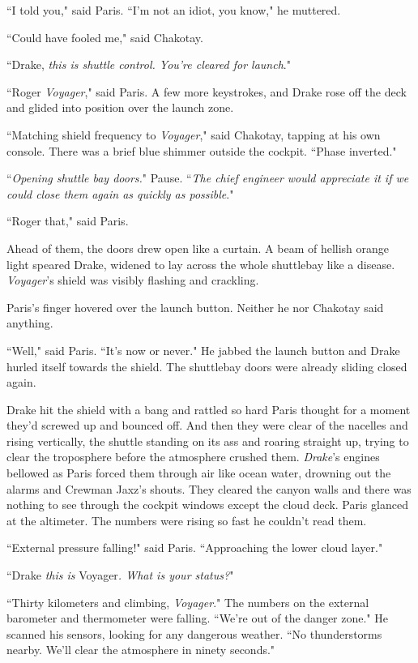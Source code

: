 \documentclass[twoside,letterpaper,12pt]{memoir}
\begin{document}
``I told you," said Paris. ``I'm not an idiot, you know," he muttered.

``Could have fooled me," said Chakotay.

``Drake, \textit{this is shuttle control. You're cleared for launch}."

``Roger \textit{Voyager}," said Paris. A few more keystrokes, and Drake rose off the deck and glided into position over the launch zone.

``Matching shield frequency to \textit{Voyager}," said Chakotay, tapping at his own console. There was a brief blue shimmer outside the cockpit. ``Phase inverted."

``\textit{Opening shuttle bay doors.}" Pause. ``\textit{The chief engineer would appreciate it if we could close them again as quickly as possible}."

``Roger that," said Paris.

Ahead of them, the doors drew open like a curtain. A beam of hellish orange light speared Drake, widened to lay across the whole shuttlebay like a disease. \textit{Voyager}'s shield was visibly flashing and crackling.

Paris's finger hovered over the launch button. Neither he nor Chakotay said anything.

``Well," said Paris. ``It's now or never." He jabbed the launch button and Drake hurled itself towards the shield. The shuttlebay doors were already sliding closed again.

Drake hit the shield with a bang and rattled so hard Paris thought for a moment they'd screwed up and bounced off. And then they were clear of the nacelles and rising vertically, the shuttle standing on its ass and roaring straight up, trying to clear the troposphere before the atmosphere crushed them. \textit{Drake}'s engines bellowed as Paris forced them through air like ocean water, drowning out the alarms and Crewman Jaxz's shouts. They cleared the canyon walls and there was nothing to see through the cockpit windows except the cloud deck. Paris glanced at the altimeter. The numbers were rising so fast he couldn't read them.

``External pressure falling!" said Paris. ``Approaching the lower cloud layer."

``Drake \textit{this is }Voyager\textit{. What is your status?}"

``Thirty kilometers and climbing, \textit{Voyager}." The numbers on the external barometer and thermometer were falling. ``We're out of the danger zone." He scanned his sensors, looking for any dangerous weather. ``No thunderstorms nearby. We'll clear the atmosphere in ninety seconds."
\end{document}
